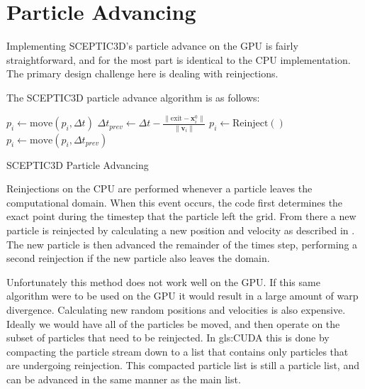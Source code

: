 	\section{Particle Advancing}
	Implementing SCEPTIC3D's particle advance on the GPU is fairly straightforward, and for the most part is identical to the CPU implementation. The primary design challenge here is dealing with reinjections.

The SCEPTIC3D particle advance algorithm is as follows:

\begin{algorithm}
	\begin{algorithmic}
		\STATE $p_i \leftarrow \mathrm{move}(p_i,\Delta t)$
			\STATE $\Delta t_{prev} \leftarrow \Delta t - \frac{\|\mathbf{\mathrm{exit}} - \mathbf{x}_i^0\|}{\|\mathbf{v}_i\|}$
			\STATE $p_i \leftarrow \mathrm{Reinject}()$
			\STATE $p_i \leftarrow \mathrm{move}(p_i,\Delta t_{prev})$
		\ENDWHILE	
		\ENDFOR
	\end{algorithmic}
	\caption{SCEPTIC3D Particle Advancing}
	\label{alg:padvnc}
\end{algorithm}

Reinjections on the CPU are performed whenever a particle leaves the computational domain. When this event occurs, the code first determines the exact point during the timestep that the particle left the grid. From there a new particle is reinjected by calculating a new position and velocity as described in \cite{Patacchini2007}. The new particle is then advanced the remainder of the times step, performing a second reinjection if the new particle also leaves the domain. 

Unfortunately this method does not work well on the GPU. If this same algorithm were to be used on the GPU it would result in a large amount of warp divergence. Calculating new random positions and velocities is also expensive. Ideally we would have all of the particles be moved, and then operate on the subset of particles that need to be reinjected. In \gls{gls:CUDA} this is done by compacting the particle stream down to a list that contains only particles that are undergoing reinjection. This compacted particle list is still a particle list, and can be advanced in the same manner as the main list.  





